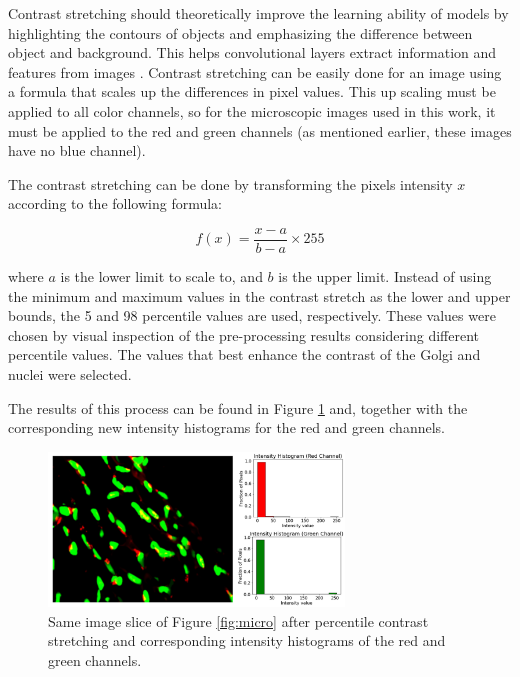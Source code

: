 Contrast stretching should theoretically improve the learning ability of models by highlighting the contours of objects and emphasizing the difference between object and background. This helps convolutional layers extract information and features from images \cite{contrast_strect}. Contrast stretching can be easily done for an image using a formula that scales up the differences in pixel values. This up scaling must be applied to all color channels, so for the microscopic images used in this work, it must be applied to the red and green channels (as mentioned earlier, these images have no blue channel).

The contrast stretching can be done by transforming the pixels intensity $x$ according to the following formula:

\begin{equation}
    \label{eq:contrast}
    f(x) = \frac{x-a}{b-a} \times 255
\end{equation}


\noindent where $a$ is the lower limit to scale to, and $b$ is the upper limit. Instead of using the minimum and maximum values in the contrast stretch as the lower and upper bounds, the 5 and 98 percentile values are used, respectively. These values were chosen by visual inspection of the pre-processing results considering different percentile values. The values that best enhance the contrast of the Golgi and nuclei were selected.

The results of this process can be found in Figure \ref{fig:micro_pre} and, together with the corresponding new intensity histograms for the red and green channels.

\begin{figure}[!htb]
  \centering
  \includegraphics[width=0.70\textwidth]{Images/pre.jpg}
  \caption{Same image slice of Figure \ref{fig:micro} after percentile contrast stretching and corresponding intensity histograms of the red and green channels.}
  \label{fig:micro_pre}
\end{figure}


